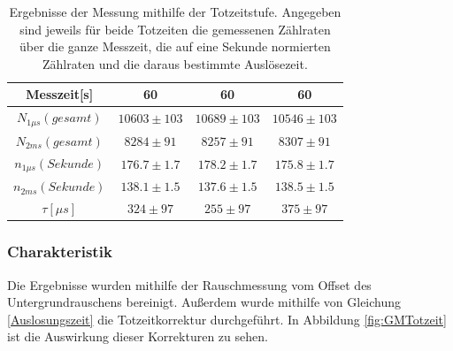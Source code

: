 \documentclass[12pt,a4paper]{article}
\begin{document}
\begin{table}[H]
\centering
\begin{tabular}{|c|c|c|c|}
\hline
Messzeit[s] & 60 &60&60\\
\hline 
$N_{1\mu s}(gesamt)$ & $10603 \pm 103$ & $10689\pm 103$ & $10546\pm 103$ \\
\hline 
$N_{2ms}(gesamt)$ & $8284\pm 91$ & $8257 \pm 91$ & $8307\pm 91$ \\
\hline 
$n_{1\mu s}(Sekunde)$ & $176.7 \pm 1.7$ & $178.2 \pm 1.7$ & $175.8\pm 1.7$ \\
\hline 
$n_{2ms}(Sekunde)$ & $138.1\pm 1.5$ & $137.6 \pm 1.5$ & $138.5\pm 1.5$ \\
\hline 
$\tau [\mu s]$ & $324\pm 97 $ & $255 \pm 97$ & $375\pm 97$ \\
\hline
\end{tabular}
\caption{Ergebnisse der Messung mithilfe der Totzeitstufe. Angegeben sind jeweils für beide Totzeiten die gemessenen Zählraten über die ganze Messzeit, die auf eine Sekunde normierten Zählraten und die daraus bestimmte Auslösezeit.}
\label{tab:Totzeitstufe}
\end{table}


\subsubsection{Charakteristik}
\label{GMchar}

Die Ergebnisse wurden mithilfe der Rauschmessung vom Offset des Untergrundrauschens bereinigt. 
Außerdem wurde mithilfe von Gleichung \ref{Auslosungszeit} die Totzeitkorrektur durchgeführt. In Abbildung \ref{fig:GMTotzeit} ist die Auswirkung dieser Korrekturen zu sehen.
\end{document}
